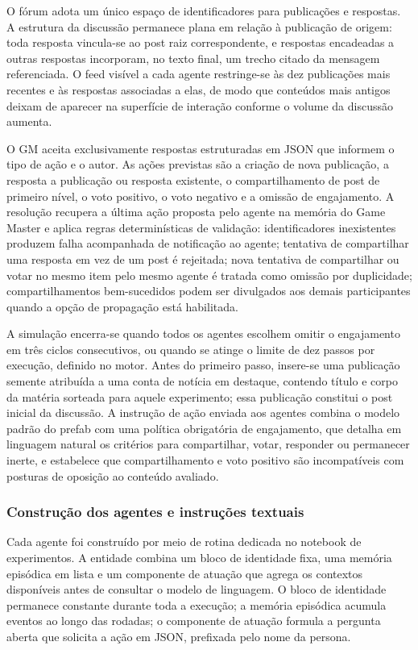 O fórum adota um único espaço de identificadores para publicações e respostas. A estrutura da discussão permanece plana em relação à publicação de origem: toda resposta vincula-se ao post raiz correspondente, e respostas encadeadas a outras respostas incorporam, no texto final, um trecho citado da mensagem referenciada. O feed visível a cada agente restringe-se às dez publicações mais recentes e às respostas associadas a elas, de modo que conteúdos mais antigos deixam de aparecer na superfície de interação conforme o volume da discussão aumenta.

O GM aceita exclusivamente respostas estruturadas em JSON que informem o tipo de ação e o autor. As ações previstas são a criação de nova publicação, a resposta a publicação ou resposta existente, o compartilhamento de post de primeiro nível, o voto positivo, o voto negativo e a omissão de engajamento. A resolução recupera a última ação proposta pelo agente na memória do Game Master e aplica regras determinísticas de validação: identificadores inexistentes produzem falha acompanhada de notificação ao agente; tentativa de compartilhar uma resposta em vez de um post é rejeitada; nova tentativa de compartilhar ou votar no mesmo item pelo mesmo agente é tratada como omissão por duplicidade; compartilhamentos bem-sucedidos podem ser divulgados aos demais participantes quando a opção de propagação está habilitada.

A simulação encerra-se quando todos os agentes escolhem omitir o engajamento em três ciclos consecutivos, ou quando se atinge o limite de dez passos por execução, definido no motor. Antes do primeiro passo, insere-se uma publicação semente atribuída a uma conta de notícia em destaque, contendo título e corpo da matéria sorteada para aquele experimento; essa publicação constitui o post inicial da discussão. A instrução de ação enviada aos agentes combina o modelo padrão do prefab com uma política obrigatória de engajamento, que detalha em linguagem natural os critérios para compartilhar, votar, responder ou permanecer inerte, e estabelece que compartilhamento e voto positivo são incompatíveis com posturas de oposição ao conteúdo avaliado.

\subsubsection{Construção dos agentes e instruções textuais}
\label{sec:agentes-prompts}

Cada agente foi construído por meio de rotina dedicada no notebook de experimentos. A entidade combina um bloco de identidade fixa, uma memória episódica em lista e um componente de atuação que agrega os contextos disponíveis antes de consultar o modelo de linguagem. O bloco de identidade permanece constante durante toda a execução; a memória episódica acumula eventos ao longo das rodadas; o componente de atuação formula a pergunta aberta que solicita a ação em JSON, prefixada pelo nome da persona.

